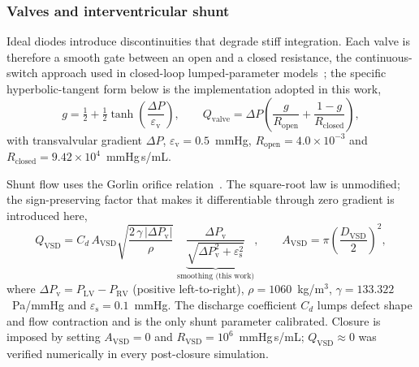 \subsubsection{Valves and interventricular shunt}
\label{sec:valves}
Ideal diodes introduce discontinuities that degrade stiff integration. Each valve is therefore a smooth gate between an open and a closed resistance, the continuous-switch approach used in closed-loop lumped-parameter models~\cite{Shi2011}; the specific hyperbolic-tangent form below is the implementation adopted in this work,
\begin{equation}
g = \tfrac{1}{2} + \tfrac{1}{2}\tanh\!\left(\frac{\Delta P}{\varepsilon_{\mathrm{v}}}\right), \qquad
Q_{\mathrm{valve}} = \Delta P\left(\frac{g}{R_{\mathrm{open}}} + \frac{1-g}{R_{\mathrm{closed}}}\right),
\label{eq:valve}
\end{equation}
with transvalvular gradient $\Delta P$, $\varepsilon_{\mathrm{v}} = 0.5$~mmHg, $R_{\mathrm{open}} = 4.0\times10^{-3}$ and $R_{\mathrm{closed}} = 9.42\times10^{4}$~mmHg\,s/mL.

Shunt flow uses the Gorlin orifice relation~\cite{Gorlin1951}. The square-root law is unmodified; the sign-preserving factor that makes it differentiable through zero gradient is introduced here,
\begin{equation}
Q_{\mathrm{VSD}} = C_d\, A_{\mathrm{VSD}} \sqrt{\frac{2\,\gamma\,\lvert\Delta P_{\mathrm{v}}\rvert}{\rho}}\;
\underbrace{\frac{\Delta P_{\mathrm{v}}}{\sqrt{\Delta P_{\mathrm{v}}^{2} + \varepsilon_{\mathrm{s}}^{2}}}}_{\text{smoothing (this work)}},
\qquad A_{\mathrm{VSD}} = \pi\left(\frac{D_{\mathrm{VSD}}}{2}\right)^{2},
\label{eq:orifice}
\end{equation}
where $\Delta P_{\mathrm{v}} = P_{\mathrm{LV}} - P_{\mathrm{RV}}$ (positive left-to-right), $\rho = 1060$~kg/m$^3$, $\gamma = 133.322$~Pa/mmHg and $\varepsilon_{\mathrm{s}} = 0.1$~mmHg. The discharge coefficient $C_d$ lumps defect shape and flow contraction and is the only shunt parameter calibrated. Closure is imposed by setting $A_{\mathrm{VSD}} = 0$ and $R_{\mathrm{VSD}} = 10^{6}$~mmHg\,s/mL; $Q_{\mathrm{VSD}} \approx 0$ was verified numerically in every post-closure simulation.

